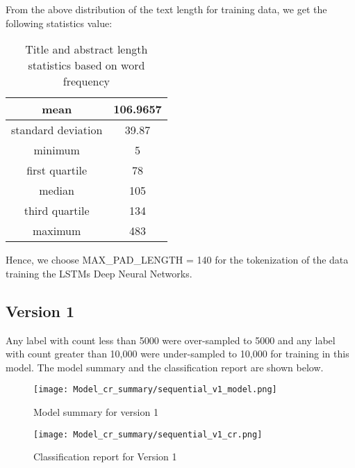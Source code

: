 From the above distribution of the text length for training data, we get the following statistics value:
\begin{table}[H]
    \begin{center}
        \begin{tabular}{ |c|c| }
            \hline
            mean               & 106.9657 \\
            \hline
            standard deviation & 39.87 \\
            \hline
            minimum            & 5       \\
            \hline
            first quartile     & 78      \\
            \hline
            median             & 105      \\
            \hline
            third quartile     & 134      \\
            \hline
            maximum            & 483     \\
            \hline
        \end{tabular}
    \end{center}
    \caption{Title and abstract length statistics based on word frequency}
    \label{table:Title and abstract length statistics based on word frequency}
\end{table}

Hence, we choose MAX\_PAD\_LENGTH = 140 for the tokenization of the data training the LSTMs Deep Neural Networks.

\subsection{Version 1}
Any label with count less than 5000 were over-sampled to 5000 and any label with count greater than 10,000 were under-sampled to 10,000 for training in this model. The model summary and the classification report are shown below.

\begin{figure}[H]
    \centering
    \texttt{[image: Model\_cr\_summary/sequential\_v1\_model.png]}
    \caption{Model summary for version 1}
    \label{fig:Model summary for version 1}
\end{figure}

\begin{figure}[H]
    \centering
    \texttt{[image: Model\_cr\_summary/sequential\_v1\_cr.png]}
    \caption{Classification report for Version 1}
    \label{fig: Classification report for Version 1}
\end{figure}

